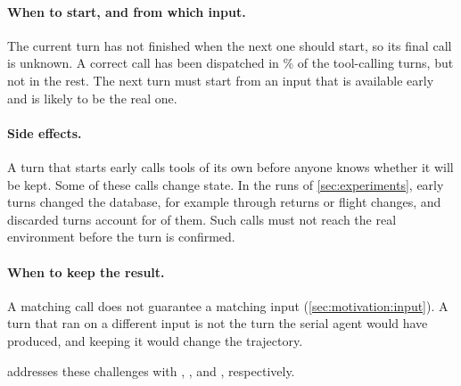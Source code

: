 \paragraph{When to start, and from which input.}
The current turn has not finished when the next one should start, so its final call is unknown.
A correct call has been dispatched in \MotAnchorPct\% of the tool-calling turns, but not in the rest.
The next turn must start from an input that is available early and is likely to be the real one.

\paragraph{Side effects.}
A turn that starts early calls tools of its own before anyone knows whether it will be kept.
Some of these calls change state.
In the \method runs of \cref{sec:experiments}, \MotStateTotal{} early turns changed the database, for example through returns or flight changes, and discarded turns account for \MotStateDiscarded{} of them.
Such calls must not reach the real environment before the turn is confirmed.

\paragraph{When to keep the result.}
A matching call does not guarantee a matching input (\cref{sec:motivation:input}).
A turn that ran on a different input is not the turn the serial agent would have produced, and keeping it would change the trajectory.

 addresses these challenges with \stratLaunch, \stratSandbox, and \stratCommit, respectively.
